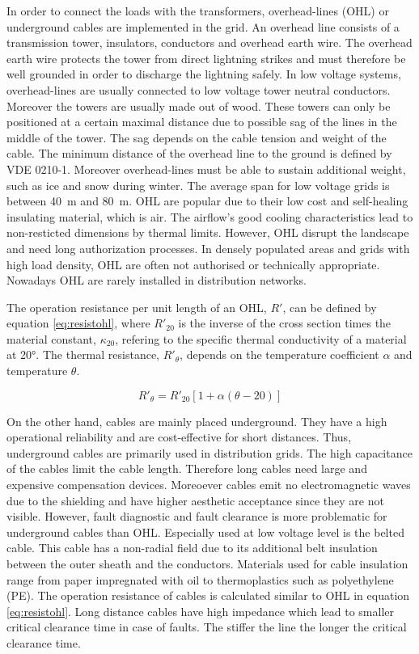 In order to connect the loads with the transformers, overhead-lines (OHL) or underground cables are implemented in the grid. An overhead line consists of a transmission tower, insulators, conductors and overhead earth wire. The overhead earth wire protects the tower from direct lightning strikes and must therefore be well grounded in order to discharge the lightning safely. In low voltage systems, overhead-lines are usually connected to low voltage tower neutral conductors. Moreover the towers are usually made out of wood. These towers can only be positioned at a certain maximal distance due to possible sag of the lines in the middle of the tower. The sag depends on the cable tension and weight of the cable. The minimum distance of the overhead line to the ground is defined by VDE 0210-1. %
Moreover overhead-lines must be able to sustain additional weight, such as ice and snow during winter. The average span for low voltage grids is between 40~m and 80~m. 
OHL are popular due to their low cost and self-healing insulating material, which is air. The airflow's good cooling characteristics lead to non-resticted dimensions by thermal limits. However, OHL disrupt the landscape and need long authorization processes. In densely populated areas and grids with high load density, OHL are often not authorised or technically appropriate. Nowadays OHL are rarely installed in distribution networks. %

The operation resistance per unit length of an OHL, $R'$, can be defined by equation \ref{eq:resistohl}, where $R'_{20}$ is the inverse of the cross section times the material constant, $\kappa_{20}$, refering to the specific thermal conductivity of a material at 20°. The thermal resistance, $R'_{\theta}$, depends on the temperature coefficient $\alpha$ and temperature $\theta$. 

\begin{equation}
    R'_{\theta}=R'_{20}[1+\alpha(\theta-20)]
    \label{eq:resistohl}
\end{equation}

On the other hand, cables are mainly placed underground. They have a high operational reliability and are cost-effective for short distances. Thus, underground cables are primarily used in distribution grids. The high capacitance of the cables limit the cable length. Therefore long cables need large and expensive compensation devices. Moreoever cables emit no electromagnetic waves due to the shielding and have higher aesthetic acceptance since they are not visible. However, fault diagnostic and fault clearance is more problematic for underground cables than OHL.  %
Especially used at low voltage level is the belted cable. This cable has a non-radial field due to its additional belt insulation between the outer sheath and the conductors. Materials used for cable insulation range from paper impregnated with oil to thermoplastics such as polyethylene (PE).  The operation resistance of cables is calculated similar to OHL in equation \ref{eq:resistohl}. Long distance cables have high impedance which lead to smaller critical clearance time in case of faults. The stiffer the line the longer the critical clearance time. %

